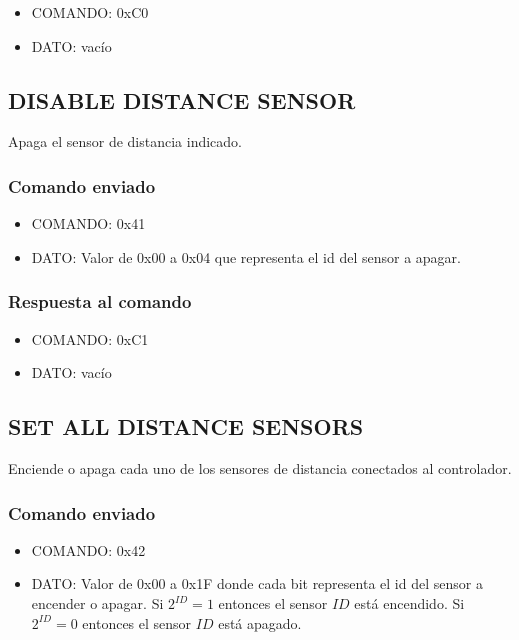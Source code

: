 \documentclass[a4paper,10pt]{article}
\begin{document}
\begin{itemize}
	\item{COMANDO:} 0xC0
	\item{DATO:} vac\'io
\end{itemize}

\subsection{DISABLE DISTANCE SENSOR}
\label{disable_distance_sensor}

Apaga el sensor de distancia indicado.

\subsubsection*{Comando enviado}

\begin{itemize}
	\item{COMANDO:} 0x41
	\item{DATO:} Valor de 0x00 a 0x04 que representa el id del sensor a apagar.
\end{itemize}

\subsubsection*{Respuesta al comando}

\begin{itemize}
	\item{COMANDO:} 0xC1
	\item{DATO:} vac\'io
\end{itemize}

\subsection{SET ALL DISTANCE SENSORS}
\label{set_all_distance_sensors}

Enciende o apaga cada uno de los sensores de distancia conectados al controlador.

\subsubsection*{Comando enviado}

\begin{itemize}
	\item{COMANDO:} 0x42
	\item{DATO:} Valor de 0x00 a 0x1F donde cada bit representa el id del sensor a encender o apagar.
	Si $2^{ID} = 1$ entonces el sensor $ID$ est\'a encendido.
	Si $2^{ID} = 0$ entonces el sensor $ID$ est\'a apagado.
\end{itemize}
\end{document}
